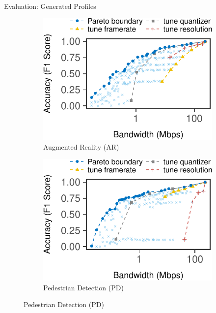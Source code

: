 \begin{frame}{Evaluation: Generated Profiles}
  \begin{figure}
    \centering
    \begin{subfigure}[t]{0.48\textwidth}
      \centering
      \caption{Augmented Reality (AR)}
      \label{fig:ar-profile}
      \includegraphics[width=\textwidth]{figures/profile-darknet.pdf}
    \end{subfigure}
    \hfill
    \begin{subfigure}[t]{0.48\textwidth}
      \centering
      \caption{Pedestrian Detection (PD)}
      \label{fig:pd-profile}
      \includegraphics[width=\textwidth]{figures/profile-mot.pdf}
    \end{subfigure}
  \end{figure}

  \begin{itemize}
    \footnotesize
  \end{itemize}
\end{frame}


